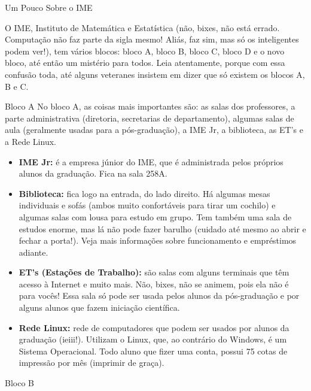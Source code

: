 \begin{secao}{Um Pouco Sobre o IME}
	
O IME, Instituto de Matemática e Estatística (não, bixes, não está errado.
Computação não faz parte da sigla mesmo! Aliás, faz sim, mas só os inteligentes
podem ver!), tem vários blocos: bloco A, bloco B, bloco C, bloco D e o
novo bloco, até então um mistério para todos. Leia atentamente, porque com essa
confusão toda, até alguns veteranes insistem em dizer que só existem os blocos
A, B e C.


\begin{subsecao}{Bloco A}
No bloco A, as coisas mais importantes são: as salas dos professores, a parte
administrativa (diretoria, secretarias de departamento), algumas salas de aula
(geralmente usadas para a pós-graduação), a IME Jr, a biblioteca, as ET's e a Rede Linux.

\begin{itemize}

\item {\bf IME Jr:} é a empresa júnior do IME, que é administrada pelos próprios
alunos da graduação. Fica na sala 258A.

\item {\bf Biblioteca:} fica logo na entrada, do lado direito. Há algumas mesas
individuais e sofás (ambos muito confortáveis para tirar um cochilo) e algumas salas
com lousa para estudo em grupo. Tem também uma sala de estudos enorme, 
mas lá não pode fazer barulho (cuidado até mesmo ao abrir e fechar a porta!).
Veja mais informações sobre funcionamento e empréstimos adiante.

\item {\bf ET's (Estações de Trabalho):} são salas com alguns terminais que têm
acesso à Internet e muito mais. Não, bixes, não se animem, pois ela não é para
vocês! Essa sala só pode ser usada pelos alunos da pós-graduação e por alguns
alunos que fazem iniciação científica.

\item {\bf Rede Linux:} rede de computadores que podem ser usados por alunos
da graduação (ieiii!). Utilizam o Linux, que, ao contrário do Windows, é um
Sistema Operacional. Todo aluno que fizer uma conta, possui 75 cotas de impressão por mês 
(imprimir de graça).

\end{itemize}

\end{subsecao}

\begin{subsecao}{Bloco B}



\end{subsecao}
\end{secao}
